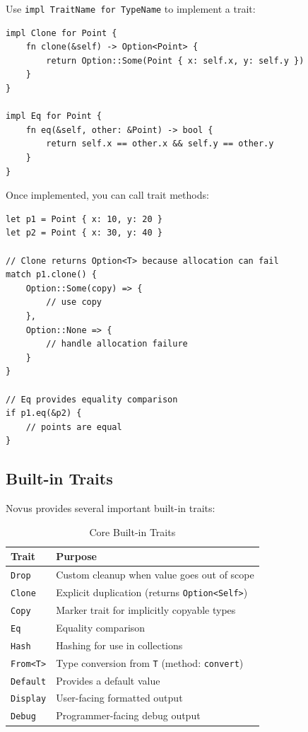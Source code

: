 Use \texttt{impl TraitName for TypeName} to implement a trait:

\begin{lstlisting}
impl Clone for Point {
    fn clone(&self) -> Option<Point> {
        return Option::Some(Point { x: self.x, y: self.y })
    }
}

impl Eq for Point {
    fn eq(&self, other: &Point) -> bool {
        return self.x == other.x && self.y == other.y
    }
}
\end{lstlisting}

Once implemented, you can call trait methods:

\begin{lstlisting}
let p1 = Point { x: 10, y: 20 }
let p2 = Point { x: 30, y: 40 }

// Clone returns Option<T> because allocation can fail
match p1.clone() {
    Option::Some(copy) => {
        // use copy
    },
    Option::None => {
        // handle allocation failure
    }
}

// Eq provides equality comparison
if p1.eq(&p2) {
    // points are equal
}
\end{lstlisting}

\subsection{Built-in Traits}

Novus provides several important built-in traits:

\begin{table}[h]
\centering
\begin{tabular}{lp{8cm}}
\hline
\textbf{Trait} & \textbf{Purpose} \\
\hline
\texttt{Drop} & Custom cleanup when value goes out of scope \\
\texttt{Clone} & Explicit duplication (returns \texttt{Option<Self>}) \\
\texttt{Copy} & Marker trait for implicitly copyable types \\
\texttt{Eq} & Equality comparison \\
\texttt{Hash} & Hashing for use in collections \\
\texttt{From<T>} & Type conversion from \texttt{T} (method: \texttt{convert}) \\
\texttt{Default} & Provides a default value \\
\texttt{Display} & User-facing formatted output \\
\texttt{Debug} & Programmer-facing debug output \\
\hline
\end{tabular}
\caption{Core Built-in Traits}
\end{table}

